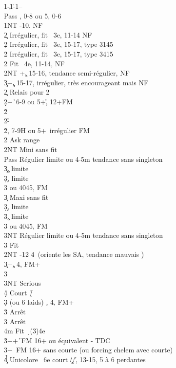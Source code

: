 \documentclass[a4paper]{article}
\begin{document}
\begin{bidtable}
1\c-1\h-1\s--\+\\
Pass \s , 0-8 ou 5\s , 0-6\\
1NT -10, NF\+\\
2\c \> Irrégulier, fit \s\ 3e, 11-14 NF\\
2\d \> Irrégulier, fit \s\ 3e, 15-17, type 3145\\
2\h \> Irrégulier, fit \s\ 3e, 15-17, type 3415\\
2\s \> Fit \s\ 4e, 11-14, NF\\
2NT +\c , 15-16, tendance semi-régulier, NF\\
3\c {}+\c , 15-17, irrégulier, très encourageant mais NF\-\\
2\c \> Relais pour 2\d \\
2\d {}+\h\ 6-9 ou 5+\h , 12+FM\+\\
2\h {}\h \\
2\s {}-\h \-\\
2\h {}\s , 7-9H ou 5+\s\ irrégulier FM\\
2\s \> Ask range\+\\
2NT \> Mini sans fit \s \+\\
Pass \> Régulier limite ou 4\s -5m tendance sans singleton\\
3\c {}\c , limite\\
3\d {}\d , limite\\
3\s {} ou 4045, FM\-\\
3\c \> Maxi sans fit \s \+\\
3\d {}\d , limite\\
3\h {}\c , limite\\
3\s {} ou 4045, FM\\
3NT \> Régulier limite ou 4\s -5m tendance sans singleton\-\\
3\s \> Fit \s \-\\
2NT -12 4\s\ (oriente les SA, tendance mauvais \s )\\
3\c {}+\c , 4\s , FM+\+\\
3\s {}\s \+\\
3NT \> Serious\\
4\d\h \> Court \d /\h \-\-\\
3\d {} (ou 6 laids) \d , 4\s , FM+\+\\
3\h \> Arrêt \h \\
3\s \> Arrêt \c \\
4m \> Fit \d\ (3)4e\-\\
3\h {}++\h\ FM 16+ ou équivalent - TDC\\
3\s {}+\s\ FM 16+ sans courte (ou forcing chelem avec courte)\\
4\c\d\h \> Unicolore \s\ 6e court \c /\d /\h , 13-15, 5 à 6 perdantes\-
\end{bidtable}
\end{document}

